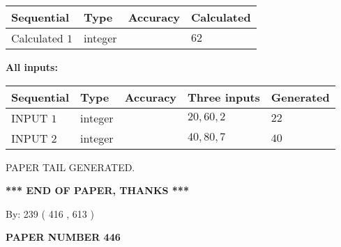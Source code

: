 \documentclass[12pt]{article}
\begin{document}
   
   
   
\noindent{}
   
   
  
  
\noindent\begin{tabular}{|l|l|l|l|}
\hline
 Sequential & Type & Accuracy & Calculated \\ 
\hline
 
 
  Calculated $  1 $ & integer &  & 
  $ 62 $ 
 \\  \hline  
 \end{tabular}
   
   
   
   
\noindent\vspace{0.1in}\hspace{-0.08in} {\textbf{\Large{All inputs: }}}
   
   
  
  
\noindent\begin{tabular}{|l|l|l|l|l|}
\hline
 Sequential & Type & Accuracy & Three inputs & Generated \\ 
\hline
 
 
  INPUT $  1 $ & integer &  & $
 20
 , 
 60
 , 
 2
 $ & $ 22 $ 
 \\  \hline  
 
 
  INPUT $  2 $ & integer &  & $
 40
 , 
 80
 , 
 7
 $ & $ 40 $ 
 \\  \hline  
 \end{tabular}
   
   
   
   
   
   
 \vspace{0.2in}
 
   
   
\vspace{2.0in} PAPER TAIL GENERATED.
   
   
   
   
\vspace{1.0in} 
{\textbf{\large{ *** END OF PAPER, THANKS *** }}} 
   
   
\hspace{1.0in} By: 
 239 ( 416 ,  613 )
   
   
   
   
\newpage 
\setcounter{page}{ 
   446001 } 
   
   
   
   
 {\textbf{ \Large{ PAPER NUMBER  446  }}}
   
\end{document}
